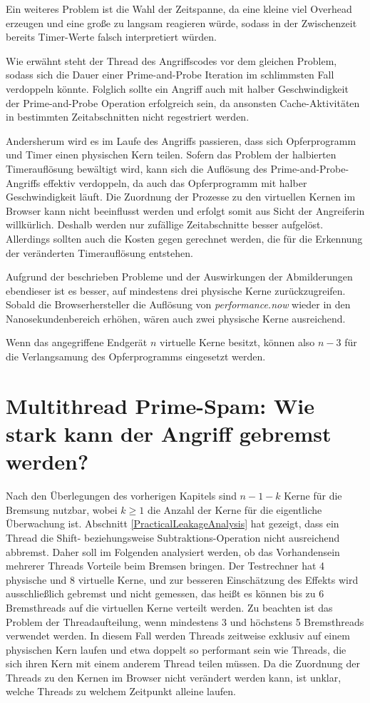 Ein weiteres Problem ist die Wahl der Zeitspanne, da eine kleine viel Overhead erzeugen und eine große zu langsam reagieren würde, sodass in der Zwischenzeit bereits Timer-Werte falsch interpretiert würden.

Wie erwähnt steht der Thread des Angriffscodes vor dem gleichen Problem, sodass sich die Dauer einer Prime-and-Probe Iteration im schlimmsten Fall verdoppeln könnte.
Folglich sollte ein Angriff auch mit halber Geschwindigkeit der Prime-and-Probe Operation erfolgreich sein, da ansonsten Cache-Aktivitäten in bestimmten Zeitabschnitten nicht regestriert werden.

Andersherum wird es im Laufe des Angriffs passieren, dass sich Opferprogramm und Timer einen physischen Kern teilen.
Sofern das Problem der halbierten Timerauflösung bewältigt wird, kann sich die Auflösung des Prime-and-Probe-Angriffs effektiv verdoppeln, da auch das Opferprogramm mit halber Geschwindigkeit läuft.
Die Zuordnung der Prozesse zu den virtuellen Kernen im Browser kann nicht beeinflusst werden und erfolgt somit aus Sicht der Angreiferin willkürlich. 
Deshalb werden nur zufällige Zeitabschnitte besser aufgelöst.
Allerdings sollten auch die Kosten gegen gerechnet werden, die für die Erkennung der veränderten Timerauflösung entstehen.

Aufgrund der beschrieben Probleme und der Auswirkungen der Abmilderungen ebendieser ist es besser, auf mindestens drei physische Kerne zurückzugreifen.
Sobald die Browserhersteller die Auflösung von \textit{performance.now} wieder in den Nanosekundenbereich erhöhen, wären auch zwei physische Kerne ausreichend. 

Wenn das angegriffene Endgerät $n$ virtuelle Kerne besitzt, können also $n-3$ für die Verlangsamung des Opferprogramms eingesetzt werden.

\section{Multithread Prime-Spam: Wie stark kann der Angriff gebremst werden?}
\label{MoreIsBetter}

Nach den Überlegungen des vorherigen Kapitels sind $n-1-k$ Kerne für die Bremsung nutzbar, wobei $k \geq 1$ die Anzahl der Kerne für die eigentliche Überwachung ist. 
Abschnitt \ref{PracticalLeakageAnalysis} hat gezeigt, dass ein Thread die Shift- beziehungsweise Subtraktions-Operation nicht ausreichend abbremst.
Daher soll im Folgenden analysiert werden, ob das Vorhandensein mehrerer Threads Vorteile beim Bremsen bringen.
Der Testrechner hat 4 physische und 8 virtuelle Kerne, und zur besseren Einschätzung des Effekts wird ausschließlich gebremst und nicht gemessen, das heißt es können bis zu 6 Bremsthreads auf die virtuellen Kerne verteilt werden.
Zu beachten ist das Problem der Threadaufteilung, wenn mindestens 3 und höchstens 5 Bremsthreads verwendet werden.
In diesem Fall werden Threads zeitweise exklusiv auf einem physischen Kern laufen und etwa doppelt so performant sein wie Threads, die sich ihren Kern mit einem anderem Thread teilen müssen.
Da die Zuordnung der Threads zu den Kernen im Browser nicht verändert werden kann, ist unklar, welche Threads zu welchem Zeitpunkt alleine laufen.


